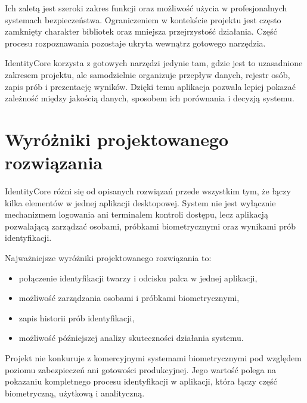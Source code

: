 Ich zaletą jest szeroki zakres funkcji oraz możliwość użycia w profesjonalnych systemach bezpieczeństwa. Ograniczeniem w kontekście projektu jest często zamknięty charakter bibliotek oraz mniejsza przejrzystość działania. Część procesu rozpoznawania pozostaje ukryta wewnątrz gotowego narzędzia.

IdentityCore korzysta z gotowych narzędzi jedynie tam, gdzie jest to uzasadnione zakresem projektu, ale samodzielnie organizuje przepływ danych, rejestr osób, zapis prób i prezentację wyników. Dzięki temu aplikacja pozwala lepiej pokazać zależność między jakością danych, sposobem ich porównania i decyzją systemu.

\newpage

\section{Wyróżniki projektowanego rozwiązania}

IdentityCore różni się od opisanych rozwiązań przede wszystkim tym, że łączy kilka elementów w jednej aplikacji desktopowej. System nie jest wyłącznie mechanizmem logowania ani terminalem kontroli dostępu, lecz aplikacją pozwalającą zarządzać osobami, próbkami biometrycznymi oraz wynikami prób identyfikacji.

Najważniejsze wyróżniki projektowanego rozwiązania to:
\begin{itemize}
    \item połączenie identyfikacji twarzy i odcisku palca w jednej aplikacji,
    \item możliwość zarządzania osobami i próbkami biometrycznymi,
    \item zapis historii prób identyfikacji,
    \item możliwość późniejszej analizy skuteczności działania systemu.
\end{itemize}

Projekt nie konkuruje z komercyjnymi systemami biometrycznymi pod względem poziomu zabezpieczeń ani gotowości produkcyjnej. Jego wartość polega na pokazaniu kompletnego procesu identyfikacji w aplikacji, która łączy część biometryczną, użytkową i analityczną.
